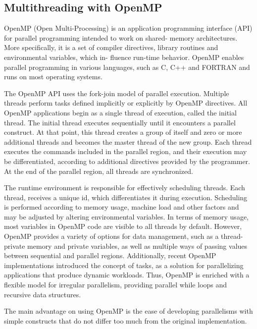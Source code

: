 






































\subsection{Multithreading with OpenMP}
OpenMP (Open Multi-Processing) is an application programming
interface (API) for parallel programming intended to work on shared-
memory architectures. More specifically, it is a set of compiler
directives, library routines and environmental variables, which in-
fluence run-time behavior. OpenMP enables parallel programming in
various languages, such as C, C++ and FORTRAN and runs on most
operating systems. \par
The OpenMP API uses the fork-join model of parallel execution.
Multiple threads perform tasks defined implicitly or explicitly by
OpenMP directives. All OpenMP applications begin as a single thread
of execution, called the initial thread. The initial thread executes
sequentially until it encounters a parallel construct. At that point,
this thread creates a group of itself and zero or more additional
threads and becomes the master thread of the new group. Each thread
executes the commands included in the parallel region, and their
execution may be differentiated, according to additional directives
provided by the programmer. At the end of the parallel region, all
threads are synchronized. \par
The runtime environment is responsible for effectively scheduling
threads. Each thread, receives a unique id, which differentiates it
during execution. Scheduling is performed according to memory
usage, machine load and other factors and may be adjusted by altering
environmental variables. In terms of memory usage, most variables in
OpenMP code are visible to all threads by default. However, OpenMP
provides a variety of options for data management, such as a thread-
private memory and private variables, as well as multiple ways of
passing values between sequential and parallel regions. Additionally,
recent OpenMP implementations introduced the concept of tasks,
as a solution for parallelizing applications that produce dynamic
workloads. Thus, OpenMP is enriched with a flexible model for
irregular parallelism, providing parallel while loops and recursive
data structures. \par
The main advantage on using OpenMP is the ease of developing parallelisms
with simple constructs that do not differ too much from the original implementation.


